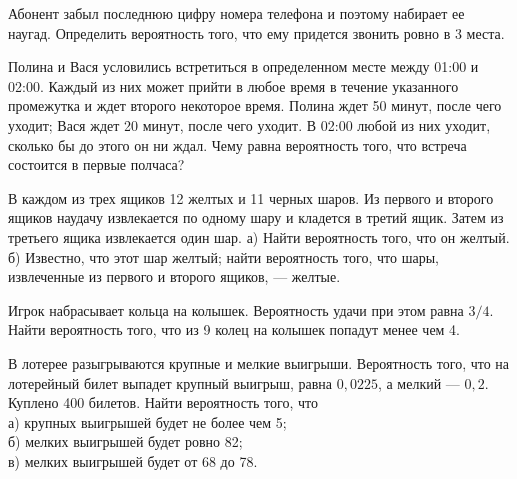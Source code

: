 \documentclass[12pt,a4paper,%
]{scrartcl}
\begin{document}

\begin{zkrW}{20}\noindent Абонент забыл последнюю цифру номера телефона и поэтому набирает ее наугад. Определить вероятность того, что ему придется звонить ровно в 3 места.
 \end{zkrW}




\begin{zkrW}{20}\noindent Полина и Вася условились встретиться в определенном месте между 01:00 и 02:00. Каждый из них может прийти в любое время в течение указанного промежутка и ждет второго некоторое время. Полина ждет 50 минут, после чего уходит; Вася ждет 20 минут, после чего уходит. В 02:00 любой из них уходит, сколько бы до этого он ни ждал. Чему равна вероятность того, что встреча состоится в первые полчаса?
 \end{zkrW}




\begin{zkrW}{20}\noindent 
В каждом из трех ящиков 12 желтых и 11 черных шаров. Из первого и второго ящиков наудачу извлекается по одному шару и кладется в третий ящик. Затем из третьего ящика извлекается один шар. а) Найти вероятность того, что он желтый. б) Известно, что этот шар желтый; найти вероятность того, что шары, извлеченные из первого и второго ящиков, --- желтые.

\end{zkrW}




\begin{zkrW}{20}\noindent Игрок набрасывает кольца на колышек. Вероятность удачи при этом равна $3/4$. Найти вероятность того, что из 9 колец на колышек попадут менее чем 4.
 \end{zkrW}





\begin{zkrW}{20}\noindent В лотерее разыгрываются крупные и мелкие выигрыши. Вероятность того, что на лотерейный билет выпадет крупный выигрыш, равна $0{,}0225$, а мелкий --- $0{,}2$. Куплено 400 билетов. Найти вероятность того, что \\ \indent а) крупных выигрышей будет не более чем 5; \\ \indent б) мелких выигрышей будет ровно 82; \\ \indent в) мелких выигрышей будет от 68 до 78.
 \end{zkrW}
\end{document}
